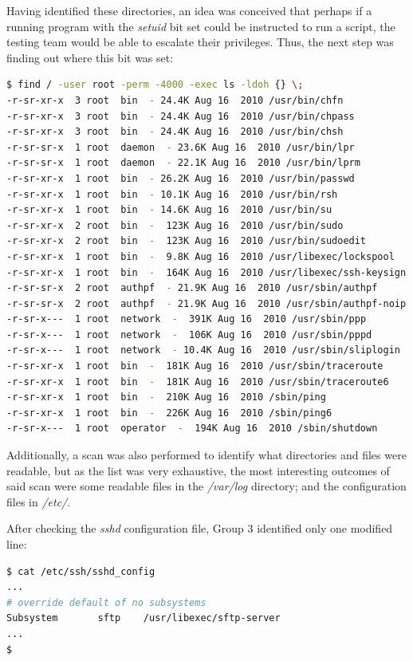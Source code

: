 Having identified these directories, an idea was conceived that perhaps if a running program with the \textit{setuid} bit set could be instructed to run a script, the testing team would be able to escalate their privileges. Thus, the next step was finding out where this bit was set:

\begin{lstlisting}[language=bash,caption={Can we hitch a ride?}]
$ find / -user root -perm -4000 -exec ls -ldoh {} \;
-r-sr-xr-x  3 root  bin  - 24.4K Aug 16  2010 /usr/bin/chfn
-r-sr-xr-x  3 root  bin  - 24.4K Aug 16  2010 /usr/bin/chpass
-r-sr-xr-x  3 root  bin  - 24.4K Aug 16  2010 /usr/bin/chsh
-r-sr-sr-x  1 root  daemon  - 23.6K Aug 16  2010 /usr/bin/lpr
-r-sr-sr-x  1 root  daemon  - 22.1K Aug 16  2010 /usr/bin/lprm
-r-sr-xr-x  1 root  bin  - 26.2K Aug 16  2010 /usr/bin/passwd
-r-sr-xr-x  1 root  bin  - 10.1K Aug 16  2010 /usr/bin/rsh
-r-sr-xr-x  1 root  bin  - 14.6K Aug 16  2010 /usr/bin/su
-r-sr-xr-x  2 root  bin  -  123K Aug 16  2010 /usr/bin/sudo
-r-sr-xr-x  2 root  bin  -  123K Aug 16  2010 /usr/bin/sudoedit
-r-sr-xr-x  1 root  bin  -  9.8K Aug 16  2010 /usr/libexec/lockspool
-r-sr-xr-x  1 root  bin  -  164K Aug 16  2010 /usr/libexec/ssh-keysign
-r-sr-sr-x  2 root  authpf  - 21.9K Aug 16  2010 /usr/sbin/authpf
-r-sr-sr-x  2 root  authpf  - 21.9K Aug 16  2010 /usr/sbin/authpf-noip
-r-sr-x---  1 root  network  -  391K Aug 16  2010 /usr/sbin/ppp
-r-sr-x---  1 root  network  -  106K Aug 16  2010 /usr/sbin/pppd
-r-sr-x---  1 root  network  - 10.4K Aug 16  2010 /usr/sbin/sliplogin
-r-sr-xr-x  1 root  bin  -  181K Aug 16  2010 /usr/sbin/traceroute
-r-sr-xr-x  1 root  bin  -  181K Aug 16  2010 /usr/sbin/traceroute6
-r-sr-xr-x  1 root  bin  -  210K Aug 16  2010 /sbin/ping
-r-sr-xr-x  1 root  bin  -  226K Aug 16  2010 /sbin/ping6
-r-sr-x---  1 root  operator  -  194K Aug 16  2010 /sbin/shutdown
\end{lstlisting}

Additionally, a scan was also performed to identify what directories and files were readable, but as the list was very exhaustive, the most interesting outcomes of said scan were some readable files in the \textit{/var/log} directory; and the configuration files in \textit{/etc/}.

After checking the \textit{sshd} configuration file, Group 3 identified only one modified line:

\begin{lstlisting}[language=bash,caption={Can we hitch a ride?}]
$ cat /etc/ssh/sshd_config                                                     
...
# override default of no subsystems
Subsystem       sftp    /usr/libexec/sftp-server
...
$ 
\end{lstlisting}

